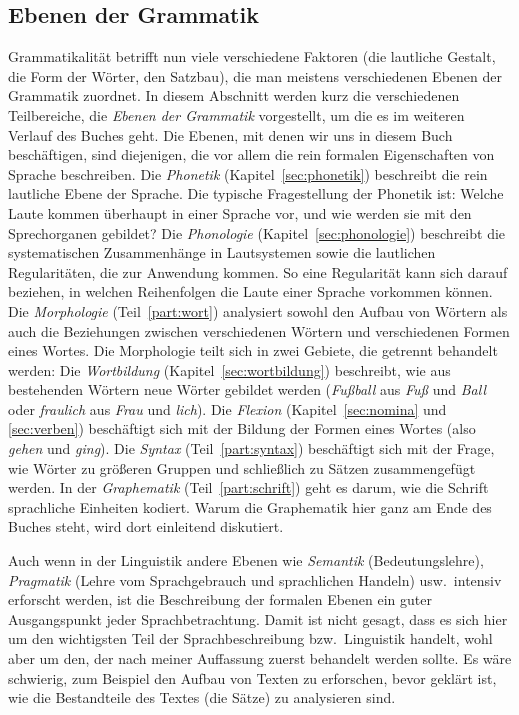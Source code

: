 \subsection{Ebenen der Grammatik}

\label{sec:grebenen}


Grammatikalität betrifft nun viele verschiedene Faktoren (\zB die lautliche Gestalt, die Form der Wörter, den Satzbau), die man meistens verschiedenen Ebenen der Grammatik zuordnet.
In diesem Abschnitt werden kurz die verschiedenen Teilbereiche, die \textit{Ebenen der Grammatik} vorgestellt, um die es im weiteren Verlauf des Buches geht.
Die Ebenen, mit denen wir uns in diesem Buch beschäftigen, sind diejenigen, die vor allem die rein formalen Eigenschaften von Sprache beschreiben.
Die \textit{Phonetik} (Kapitel~\ref{sec:phonetik}) beschreibt die rein lautliche Ebene der Sprache.
Die typische Fragestellung der Phonetik ist:
Welche Laute kommen überhaupt in einer Sprache vor, und wie werden sie mit den Sprechorganen gebildet?
Die \textit{Phonologie} (Kapitel~\ref{sec:phonologie}) beschreibt die systematischen Zusammenhänge in Lautsystemen sowie die lautlichen Regularitäten, die zur Anwendung kommen.
So eine Regularität kann sich \zB darauf beziehen, in welchen Reihenfolgen die Laute einer Sprache vorkommen können.
Die \textit{Morphologie} (Teil~\ref{part:wort}) analysiert sowohl den Aufbau von Wörtern als auch die Beziehungen zwischen verschiedenen Wörtern und verschiedenen Formen eines Wortes.
Die Morphologie teilt sich in zwei Gebiete, die getrennt behandelt werden:
Die \textit{Wortbildung} (Kapitel~\ref{sec:wortbildung}) beschreibt, wie aus bestehenden Wörtern neue Wörter gebildet werden (\zB \textit{Fußball} aus \textit{Fuß} und \textit{Ball} oder \textit{fraulich} aus \textit{Frau} und \textit{lich}).
Die \textit{Flexion} (Kapitel~\ref{sec:nomina} und \ref{sec:verben}) beschäftigt sich mit der Bildung der Formen eines Wortes (also \zB \textit{gehen} und \textit{ging}). 
Die \textit{Syntax} (Teil~\ref{part:syntax}) beschäftigt sich mit der Frage, wie Wörter zu größeren Gruppen und schließlich zu Sätzen zusammengefügt werden.
In der \textit{Graphematik} (Teil~\ref{part:schrift}) geht es darum, wie die Schrift sprachliche Einheiten kodiert.
Warum die Graphematik hier ganz am Ende des Buches steht, wird dort einleitend diskutiert.

Auch wenn in der Linguistik andere Ebenen wie \textit{Semantik} (Bedeutungslehre), \textit{Pragmatik} (Lehre vom Sprachgebrauch und sprachlichen Handeln) usw.\ intensiv erforscht werden, ist die Beschreibung der formalen Ebenen ein guter Ausgangspunkt jeder Sprachbetrachtung.
Damit ist nicht gesagt, dass es sich hier um den wichtigsten Teil der Sprachbeschreibung bzw.\ Linguistik handelt, wohl aber um den, der nach meiner Auffassung zuerst behandelt werden sollte.
Es wäre schwierig, zum Beispiel den Aufbau von Texten zu erforschen, bevor geklärt ist, wie die Bestandteile des Textes (die Sätze) zu analysieren sind.

